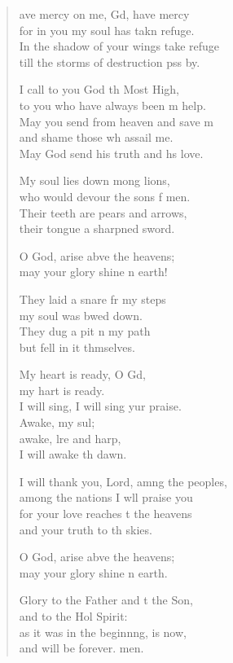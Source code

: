 \settowidth{\versewidth}{I will thank you, Lord, among the peoples, *}
\begin{verse}%
  \begin{patverse}
    ave mercy on me, Gd, have mercy\Med\\
for in you my soul has takn refuge.\\
In the shadow of your wings  take refuge\Med\\
till the storms of destruction pss by.

I call to you God th Most High,\Med\\
to you who have always been m help.\\
May you send from heaven and save m\Flex\\
and shame those wh assail me.\Med\\
May God send his truth and h\pointup{\i}s love.

My soul lies down mong lions,\Med\\
who would devour the sons f men.\\
Their teeth are pears and arrows,\Med\\
their tongue a sharpned sword.

O God, arise abve the heavens;\Med\\
may your glory shine n earth!

They laid a snare fr my steps\Med\\
my soul was bwed down.\\
They dug a pit \pointup{\i}n my path\Med\\
but fell in it thmselves.

My heart is ready, O Gd,\Flex\\
my hart is ready.\Med\\
I will sing, I will sing yur praise.\\
Awake, my sul;\Flex\\
awake, lre and harp,\Med\\
I will awake th dawn.

I will thank you, Lord, amng the peoples,\Med\\
among the nations I w\pointup{\i}ll praise you\\
for your love reaches t the heavens\Med\\
and your truth to th skies.

O God, arise abve the heavens;\Med\\
may your glory shine n earth.

Glory to the Father and t the Son,\Med\\
and to the Hol Spirit:\\
as it was in the beginn\pointup{\i}ng, is now,\Med\\
and will be forever. men. 
  \end{patverse}
\end{verse}
